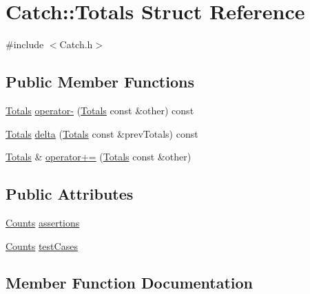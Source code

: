 \hypertarget{struct_catch_1_1_totals}{}\section{Catch\+:\+:Totals Struct Reference}
\label{struct_catch_1_1_totals}


{\ttfamily \#include $<$Catch.\+h$>$}

\subsection*{Public Member Functions}
\begin{DoxyCompactItemize}
\item 
\hyperlink{struct_catch_1_1_totals}{Totals} \hyperlink{struct_catch_1_1_totals_abe15cd8a82ba9a4868dd7a542add827c}{operator-\/} (\hyperlink{struct_catch_1_1_totals}{Totals} const \&other) const 
\item 
\hyperlink{struct_catch_1_1_totals}{Totals} \hyperlink{struct_catch_1_1_totals_a3dee0f599c081a8360c0112fb1dafe8f}{delta} (\hyperlink{struct_catch_1_1_totals}{Totals} const \&prev\+Totals) const 
\item 
\hyperlink{struct_catch_1_1_totals}{Totals} \& \hyperlink{struct_catch_1_1_totals_a574015076e54cc405c70b053e3356e43}{operator+=} (\hyperlink{struct_catch_1_1_totals}{Totals} const \&other)
\end{DoxyCompactItemize}
\subsection*{Public Attributes}
\begin{DoxyCompactItemize}
\item 
\hyperlink{struct_catch_1_1_counts}{Counts} \hyperlink{struct_catch_1_1_totals_a885ded66df752147b30c3d45aa602ec9}{assertions}
\item 
\hyperlink{struct_catch_1_1_counts}{Counts} \hyperlink{struct_catch_1_1_totals_adb195fe477aedee2ecea88c888f16506}{test\+Cases}
\end{DoxyCompactItemize}


\subsection{Member Function Documentation}
